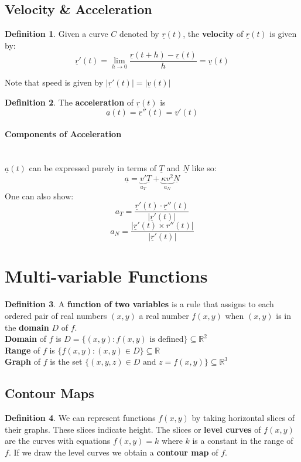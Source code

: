 \documentclass[12 pt]{article}
\theoremstyle{definition}
\newtheorem{defn}{Definition}
\begin{document}
\subsection{Velocity \& Acceleration}
\begin{defn}
	Given a curve $C$ denoted by $\underline{r}(t)$, the \textbf{velocity} of $\underline{r}(t)$ is given by: $$\underline{r}'(t)=\lim_{h\to 0} \frac{\underline{r}(t+h)-\underline{r}(t)}{h}=\underline{v}(t)$$
\end{defn}
Note that speed is given by $|\underline{r}'(t)|=|\underline{v}(t)|$
\begin{defn}
	The \textbf{acceleration} of $\underline{r}(t)$ is $$\underline{a}(t)=\underline{r}''(t)=\underline{v}'(t)$$
\end{defn}
\paragraph{Components of Acceleration}~
\\ $\underline{a}(t)$ can be expressed purely in terms of $\underline{T}$ and $\underline{N}$ like so: $$\underline{a}=\underbrace{v'}_{a_T}\underline{T}+\underbrace{\kappa v^2}_{a_N} \underline{N}$$
One can also show: 
$$a_T=\frac{\underline{r}'(t)\cdot \underline{r}''(t)}{|\underline{r}'(t)|}$$
$$a_N=\frac{|\underline{r}'(t)\times r''(t)|}{|\underline{r}'(t)|}$$
\section{Multi-variable Functions}
\begin{defn}
	A \textbf{function of two variables} is a rule that assigns to each ordered pair of real numbers $(x,y)$ a real number $f(x,y)$ when $(x,y)$ is in the \textbf{domain} $D$ of $f$.
	\\\textbf{Domain} of $f$ is $D=\{(x,y):f(x,y)\text{ is defined}\}\subseteq\mathbb{R}^2$
	\\\textbf{Range} of $f$ is $\{f(x,y):(x,y)\in D\}\subseteq \mathbb{R}$
	\\\textbf{Graph} of $f$ is the set $\{(x,y,z)\in D \text{ and }z=f(x,y)\}\subseteq \mathbb{R}^3$
\end{defn}
\subsection{Contour Maps}
\begin{defn}
	We can represent functions $f(x,y)$ by taking horizontal slices of their graphs. These slices indicate height. The slices or \textbf{level curves} of $f(x,y)$ are the curves with equations $f(x,y)=k$ where $k$ is a constant in the range of $f$. If we draw the level curves we obtain a \textbf{contour map} of $f$.
\end{defn}
\end{document}
